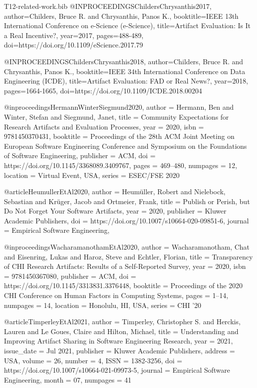 \begin{filecontents}{T12-related-work.bib}
@INPROCEEDINGS{ChildersChrysanthis2017,
  author={Childers, Bruce R. and Chrysanthis, Panos K.},
  booktitle={IEEE 13th International Conference on e-Science (e-Science)}, 
  title={{Artifact Evaluation: Is It a Real Incentive?}}, 
  year={2017},
  pages={488-489},
  doi={https://doi.org/10.1109/eScience.2017.79}
}

@INPROCEEDINGS{ChildersChrysanthis2018,  
    author={Childers, Bruce R. and Chrysanthis, Panos K.}, 
    booktitle={IEEE 34th International Conference on Data Engineering (ICDE)},   
    title={{Artifact Evaluation: FAD or Real News?}},   
    year={2018},  
    pages={1664-1665},  
    doi={https://doi.org/10.1109/ICDE.2018.00204}
}

@inproceedings{HermannWinterSiegmund2020,
author = {Hermann, Ben and Winter, Stefan and Siegmund, Janet},
title = {{Community Expectations for Research Artifacts and Evaluation Processes}},
year = {2020},
isbn = {9781450370431},
booktitle = {Proceedings of the 28th ACM Joint Meeting on European Software Engineering Conference and Symposium on the Foundations of Software Engineering},
publisher = {ACM},
doi = {https://doi.org/10.1145/3368089.3409767},
pages = {469–480},
numpages = {12},
location = {Virtual Event, USA},
series = {ESEC/FSE 2020}
}

@article{HeumullerEtAl2020,
author = {Heum\"{u}ller, Robert and Nielebock, Sebastian and Kr\"{u}ger, Jacob and Ortmeier, Frank},
title = {{Publish or Perish, but Do Not Forget Your Software Artifacts}},
year = {2020},
publisher = {Kluwer Academic Publishers},
doi = {https://doi.org/10.1007/s10664-020-09851-6},
journal = {Empirical Software Engineering},
}

@inproceedings{WacharamanothamEtAl2020,
    author = {Wacharamanotham, Chat and Eisenring, Lukas and Haroz, Steve and Echtler, Florian},
    title = {{Transparency of CHI Research Artifacts: Results of a Self-Reported Survey}},
    year = {2020},
    isbn = {9781450367080},
    publisher = {ACM},
    doi = {https://doi.org/10.1145/3313831.3376448},
    booktitle = {Proceedings of the 2020 CHI Conference on Human Factors in Computing Systems},
    pages = {1–14},
    numpages = {14},
    location = {Honolulu, HI, USA},
    series = {CHI '20}
}

@article{TimperleyEtAl2021,
    author = {Timperley, Christopher S. and Herckis, Lauren and Le Goues, Claire and Hilton, Michael},
    title = {{Understanding and Improving Artifact Sharing in Software Engineering Research}},
    year = {2021},
    issue_date = {Jul 2021},
    publisher = {Kluwer Academic Publishers},
    address = {USA},
    volume = {26},
    number = {4},
    ISSN = {1382-3256},
    doi = {https://doi.org/10.1007/s10664-021-09973-5},
    journal = {Empirical Software Engineering},
    month = {07},
    numpages = {41}
}


\end{filecontents}
